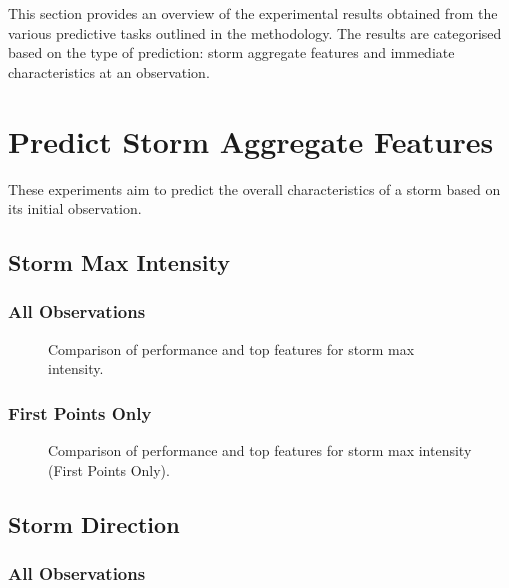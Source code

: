 This section provides an overview of the experimental results obtained from the various predictive tasks outlined in the methodology. The results are categorised based on the type of prediction: storm aggregate features and immediate characteristics at an observation.

\section{Predict Storm Aggregate Features}

These experiments aim to predict the overall characteristics of a storm based on its initial observation.

\subsection{Storm Max Intensity}

\subsubsection{All Observations}

\begin{figure}[h]
    \centering
    \caption{Comparison of performance and top features for storm max intensity.}
    \label{fig:storm_max_intensity_summary}
\end{figure}

\subsubsection{First Points Only}

\begin{figure}[h]
    \centering
    \caption{Comparison of performance and top features for storm max intensity (First Points Only).}
    \label{fig:storm_max_intensity_first_points_summary}
\end{figure}

\subsection{Storm Direction}

\subsubsection{All Observations}

